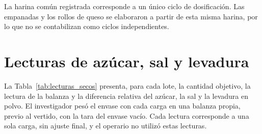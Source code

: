 La harina común registrada corresponde a un único ciclo de dosificación.
Las empanadas y los rollos de queso se elaboraron a partir de esta misma
harina, por lo que no se contabilizan como ciclos independientes.


\section{Lecturas de azúcar, sal y levadura}
\label{sec:lecturas_secos}

La Tabla~\ref{tab:lecturas_secos} presenta, para cada lote, la cantidad
objetivo, la lectura de la balanza y la diferencia relativa del azúcar, la
sal y la levadura en polvo. El investigador pesó el envase con cada
carga en una balanza propia, previo al vertido, con la tara del envase
vacío. Cada lectura corresponde a una sola carga, sin ajuste final, y el
operario no utilizó estas lecturas.

